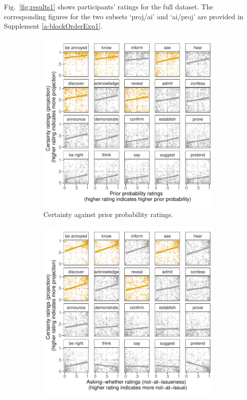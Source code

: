 \documentclass[11pt,fleqn]{article}
\newcommand{\6}{\mbox{$[\hspace*{-.6mm}[$}}
\newcommand{\9}{\mbox{$]\hspace*{-.6mm}]$}}
\begin{document}
Fig.~\ref{fig:results1} shows participants' ratings for the full dataset. The corresponding figures for the two subsets `proj/ai' and `ai/proj' are provided in Supplement \ref{a-blockOrderExp1}.

\begin{figure}[h!]
\centering
\begin{subfigure}[t]{0.49\textwidth}
\centering
\includegraphics[width=\textwidth]{../../results/exp1/graphs/projection-by-prior}
\caption{Certainty against prior probability ratings.}\label{fig:certainty-by-prior}
\end{subfigure} \hfill \begin{subfigure}[t]{0.49\textwidth}
\centering
\includegraphics[width=\textwidth]{../../results/exp1/graphs/projection-by-ai}

\end{subfigure}
\end{figure}
\end{document}
